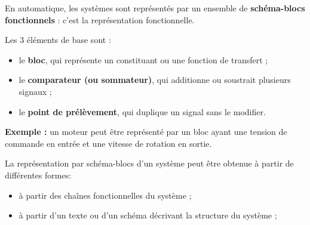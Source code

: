 En automatique, les systèmes sont représentés par un ensemble de
\textbf{schéma-blocs fonctionnels} : c'est la représentation
fonctionnelle.

Les 3 éléments de base sont :

\begin{itemize}
\item le \textbf{bloc}, qui représente un constituant ou une fonction de transfert ;
\item le \textbf{comparateur (ou sommateur)}, qui additionne ou soustrait plusieurs signaux ;
\item le \textbf{point de prélèvement}, qui duplique un signal sans le modifier.
\end{itemize}

\SASchemaElementsBase

\textbf{Exemple :} un moteur peut être représenté par un bloc ayant une tension de commande en entrée et une vitesse de rotation en sortie.

\SASchemaMoteur

La représentation par schéma-blocs d'un système peut être obtenue à
partir de différentes formes:

\begin{itemize}
\item
  à partir des chaînes fonctionnelles du système ;
\end{itemize}

\SAChaineFonctionnelle

\begin{itemize}
\item
  à partir d'un texte ou d'un schéma décrivant la structure du système ;
\end{itemize}

\SAChaineAsservie

